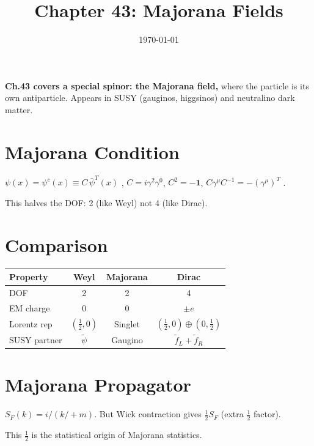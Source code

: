 \documentclass[12pt]{article}
\begin{document}
\title{Chapter 43: Majorana Fields}
\date{\today}
\maketitle

\begin{mdframed}[backgroundcolor=blue!5]
\textbf{Ch.43 covers a special spinor: the Majorana field,}
where the particle is its own antiparticle.  Appears in SUSY (gauginos,
higgsinos) and neutralino dark matter.
\end{mdframed}

\section{Majorana Condition}
\begin{mdframed}
$\displaystyle\psi(x) = \psi^c(x) \equiv C\,\bar\psi^T(x)$ ,
\quad $C=i\gamma^2\gamma^0$, $C^2=-\mathbf{1}$, $C\gamma^\mu C^{-1}=-(\gamma^\mu)^T$ .
\end{mdframed}
This halves the DOF: 2 (like Weyl) not 4 (like Dirac).

\section{Comparison}
\begin{center}
\begin{tabular}{|l|c|c|c|}
\hline
Property & Weyl & Majorana & Dirac \\
\hline
DOF & 2 & 2 & 4 \\
EM charge & 0 & 0 & $\pm e$ \\
Lorentz rep & $(\tfrac12,0)$ & Singlet & $(\tfrac12,0)\oplus(0,\tfrac12)$ \\
SUSY partner & $\tilde\psi$ & Gaugino & $\tilde f_L+\tilde f_R$ \\
\hline
\end{tabular}
\end{center}

\section{Majorana Propagator}
\begin{mdframed}
$S_F(k) = i/(k\!\!\!/+m)$.  But Wick contraction gives $\tfrac12 S_F$ (extra $\tfrac12$ factor).
\end{mdframed}
This $\tfrac12$ is the statistical origin of Majorana statistics.
\end{document}
